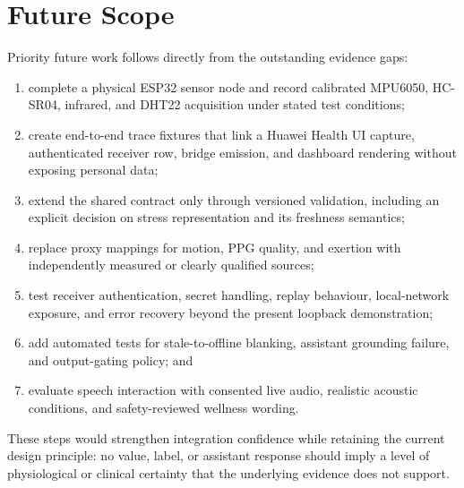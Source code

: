 \section{Future Scope}
Priority future work follows directly from the outstanding evidence gaps:
\begin{enumerate}[noitemsep,topsep=2pt]
  \item complete a physical ESP32 sensor node and record calibrated MPU6050, HC-SR04, infrared, and DHT22 acquisition under stated test conditions;
  \item create end-to-end trace fixtures that link a Huawei Health UI capture, authenticated receiver row, bridge emission, and dashboard rendering without exposing personal data;
  \item extend the shared contract only through versioned validation, including an explicit decision on stress representation and its freshness semantics;
  \item replace proxy mappings for motion, PPG quality, and exertion with independently measured or clearly qualified sources;
  \item test receiver authentication, secret handling, replay behaviour, local-network exposure, and error recovery beyond the present loopback demonstration;
  \item add automated tests for stale-to-offline blanking, assistant grounding failure, and output-gating policy; and
  \item evaluate speech interaction with consented live audio, realistic acoustic conditions, and safety-reviewed wellness wording.
\end{enumerate}

These steps would strengthen integration confidence while retaining the current design principle: no value, label, or assistant response should imply a level of physiological or clinical certainty that the underlying evidence does not support.
